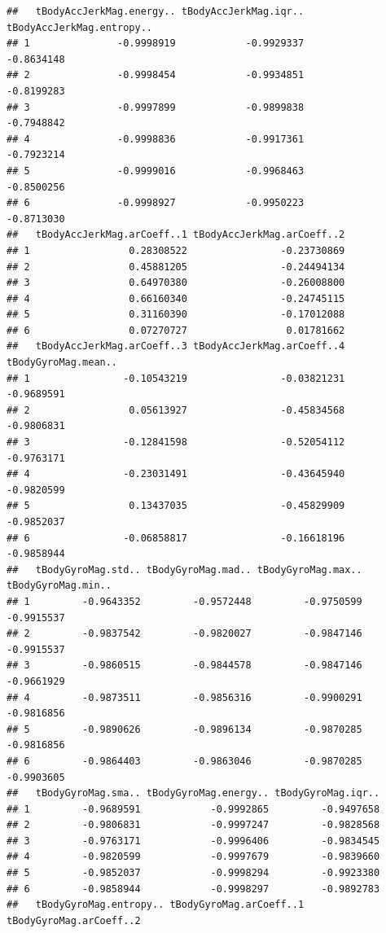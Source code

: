 \documentclass[
]{article}
\begin{document}
\begin{verbatim}
##   tBodyAccJerkMag.energy.. tBodyAccJerkMag.iqr.. tBodyAccJerkMag.entropy..
## 1               -0.9998919            -0.9929337                -0.8634148
## 2               -0.9998454            -0.9934851                -0.8199283
## 3               -0.9997899            -0.9899838                -0.7948842
## 4               -0.9998836            -0.9917361                -0.7923214
## 5               -0.9999016            -0.9968463                -0.8500256
## 6               -0.9998927            -0.9950223                -0.8713030
##   tBodyAccJerkMag.arCoeff..1 tBodyAccJerkMag.arCoeff..2
## 1                 0.28308522                -0.23730869
## 2                 0.45881205                -0.24494134
## 3                 0.64970380                -0.26008800
## 4                 0.66160340                -0.24745115
## 5                 0.31160390                -0.17012088
## 6                 0.07270727                 0.01781662
##   tBodyAccJerkMag.arCoeff..3 tBodyAccJerkMag.arCoeff..4 tBodyGyroMag.mean..
## 1                -0.10543219                -0.03821231          -0.9689591
## 2                 0.05613927                -0.45834568          -0.9806831
## 3                -0.12841598                -0.52054112          -0.9763171
## 4                -0.23031491                -0.43645940          -0.9820599
## 5                 0.13437035                -0.45829909          -0.9852037
## 6                -0.06858817                -0.16618196          -0.9858944
##   tBodyGyroMag.std.. tBodyGyroMag.mad.. tBodyGyroMag.max.. tBodyGyroMag.min..
## 1         -0.9643352         -0.9572448         -0.9750599         -0.9915537
## 2         -0.9837542         -0.9820027         -0.9847146         -0.9915537
## 3         -0.9860515         -0.9844578         -0.9847146         -0.9661929
## 4         -0.9873511         -0.9856316         -0.9900291         -0.9816856
## 5         -0.9890626         -0.9896134         -0.9870285         -0.9816856
## 6         -0.9864403         -0.9863046         -0.9870285         -0.9903605
##   tBodyGyroMag.sma.. tBodyGyroMag.energy.. tBodyGyroMag.iqr..
## 1         -0.9689591            -0.9992865         -0.9497658
## 2         -0.9806831            -0.9997247         -0.9828568
## 3         -0.9763171            -0.9996406         -0.9834545
## 4         -0.9820599            -0.9997679         -0.9839660
## 5         -0.9852037            -0.9998294         -0.9923380
## 6         -0.9858944            -0.9998297         -0.9892783
##   tBodyGyroMag.entropy.. tBodyGyroMag.arCoeff..1 tBodyGyroMag.arCoeff..2

\end{verbatim}
\end{document}
